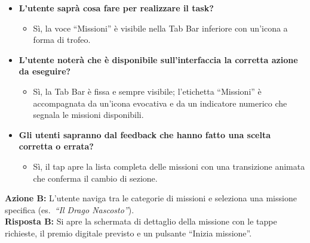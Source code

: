 \begin{itemize}[nosep, leftmargin=1.6em]
    \item \textbf{L'utente saprà cosa fare per realizzare il task?}
    \begin{itemize}[nosep, leftmargin=1.6em]
        \item Sì, la voce ``Missioni'' è visibile nella Tab Bar inferiore con un'icona a forma di trofeo.
    \end{itemize}
    \item \textbf{L'utente noterà che è disponibile sull'interfaccia la corretta azione da eseguire?}
    \begin{itemize}[nosep, leftmargin=1.6em]
        \item Sì, la Tab Bar è fissa e sempre visibile; l'etichetta ``Missioni'' è accompagnata da un'icona evocativa e da un indicatore numerico che segnala le missioni disponibili.
    \end{itemize}
    \item \textbf{Gli utenti sapranno dal feedback che hanno fatto una scelta corretta o errata?}
    \begin{itemize}[nosep, leftmargin=1.6em]
        \item Sì, il tap apre la lista completa delle missioni con una transizione animata che conferma il cambio di sezione.
    \end{itemize}
\end{itemize}

\vspace{0.3cm}
\noindent\textbf{Azione B:} L'utente naviga tra le categorie di missioni e seleziona una missione specifica (es.\ \textit{``Il Drago Nascosto''}).\\
\textbf{Risposta B:} Si apre la schermata di dettaglio della missione con le tappe richieste, il premio digitale previsto e un pulsante ``Inizia missione''.

